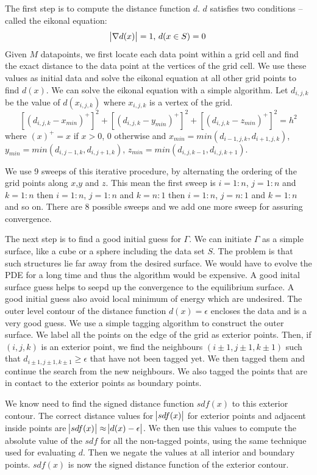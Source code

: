 \documentclass[12pt]{article}
\begin{document}
The first step is to compute the distance function $d$. $d$ satisfies two conditions -- called the eikonal equation:
$$\abs{\nabla d(x)} = 1\text{, }d(x\in S) = 0$$
Given $M$ datapoints, we first locate each data point within a grid cell and find the exact distance to the data point at the vertices of the grid cell. We use these values as initial data and solve the eikonal equation at all other grid points to find $d(x)$. We can solve the eikonal equation with a simple algorithm. Let $d_{i,j,k}$ be the value of $d(x_{i,j,k})$ where $x_{i,j,k}$ is a vertex of the grid.
$$[(d_{i,j,k} - x_{min})^+]^2 + [(d_{i,j,k} - y_{min})^+]^2 + [(d_{i,j,k} - z_{min})^+]^2 = h^2$$
where $(x)^+ = x$ if $x > 0$, $0$ otherwise and $x_{min} = min(d_{i-1,j,k}, d_{i+1,j,k})$, $y_{min} = min(d_{i,j-1,k}, d_{i,j+1,k})$, $z_{min} = min(d_{i,j,k-1}, d_{i,j,k+1})$.

We use 9 sweeps of this iterative procedure, by alternating the ordering of the grid points along $x$,$y$ and $z$. This mean the first sweep is $i=1:n$, $j=1:n$ and $k=1:n$ then $i=1:n$, $j=1:n$ and $k=n:1$ then $i=1:n$, $j=n:1$ and $k=1:n$ and so on. There are 8 possible sweeps and we add one more sweep for assuring convergence.

The next step is to find a good initial guess for $\Gamma$. We can initiate $\Gamma$ as a simple surface, like a cube or a sphere including the data set $S$. The problem is that such structures lie far away from the desired surface. We would have to evolve the PDE for a long time and thus the algorithm would be expensive. A good inital surface guess helps to seepd up the convergence to the equilibrium surface. A good initial guess also avoid local minimum of energy which are undesired. The outer level contour of the distance function $d(x) = \epsilon$ encloses the data and is a very good guess. We use a simple tagging algorithm to construct the outer surface. We label all the points on the edge of the grid as exterior points. Then, if $(i,j,k)$ is an exterior point, we find the neighbours $(i\pm 1,j\pm 1,k\pm 1)$ such that $d_{i\pm 1,j\pm 1,k\pm 1} \geq \epsilon$ that have not been tagged yet. We then tagged them and continue the search from the new neighbours. We also tagged the points that are in contact to the exterior points as boundary points.

We know need to find the signed distance function $sdf(x)$ to this exterior contour. The correct distance values for $\abs{sdf(x)}$ for exterior points and adjacent inside points are $\abs{sdf(x)} \approx \abs{d(x) - \epsilon}$. We then use this values to compute the absolute value of the $sdf$ for all the non-tagged points, using the same technique used for evaluating $d$. Then we negate the values at all interior and boundary points. $sdf(x)$ is now the signed distance function of the exterior contour.
\end{document}
